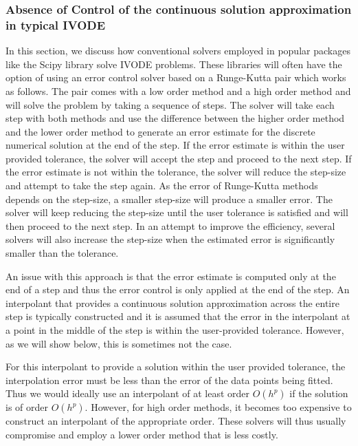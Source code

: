 \documentclass{article}
\begin{document}
\subsubsection{Absence of Control of the continuous solution approximation in typical IVODE}
\label{section:end_of_step_innacurate}
In this section, we discuss how conventional solvers employed in popular packages like the Scipy library solve IVODE problems. These libraries will often have the option of using an error control solver based on a Runge-Kutta pair which works as follows. The pair comes with a low order method and a high order method and will solve the problem by taking a sequence of steps. The solver will take each step with both methods and use the difference between the higher order method and the lower order method to generate an error estimate for the discrete numerical solution at the end of the step. If the error estimate is within the user provided tolerance, the solver will accept the step and proceed to the next step. If the error estimate is not within the tolerance, the solver will reduce the step-size and attempt to take the step again. As the error of Runge-Kutta methods depends on the step-size, a smaller step-size will produce a smaller error. The solver will keep reducing the step-size until the user tolerance is satisfied and will then proceed to the next step. In an attempt to improve the efficiency, several solvers will also increase the step-size when the estimated error is significantly smaller than the tolerance.

An issue with this approach is that the error estimate is computed only at the end of a step and thus the error control is only applied at the end of the step. An interpolant that provides a continuous solution approximation across the entire step is typically constructed and it is assumed that the error in the interpolant at a point in the middle of the step is within the user-provided tolerance. However, as we will show below, this is sometimes not the case.

For this interpolant to provide a solution within the user provided tolerance, the interpolation error must be less than the error of the data points being fitted. Thus we would ideally use an interpolant of at least order $O(h^{p})$ if the solution is of order $O(h^{p})$. However, for high order methods, it becomes too expensive to construct an interpolant of the appropriate order. These solvers will thus usually compromise and employ a lower order method that is less costly. 
\end{document}
